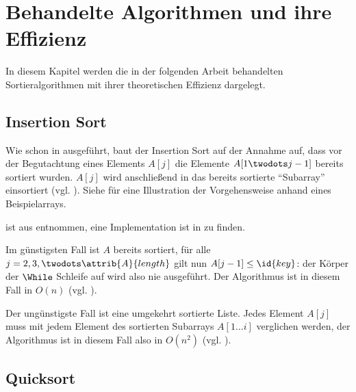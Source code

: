 \chapter{Behandelte Algorithmen und ihre Effizienz}
\label{cha:algorithmen}

In diesem Kapitel werden die in der folgenden Arbeit behandelten Sortieralgorithmen mit ihrer theoretischen Effizienz dargelegt.

\section{Insertion Sort}
\label{sec:alg-insertion}

Wie schon in  ausgeführt, baut der Insertion Sort auf der Annahme auf, dass vor der Begutachtung eines Elements $A[j]$ die Elemente $A[1 \twodots j - 1]$ bereits sortiert wurden. $A[j]$ wird anschließend in das bereits sortierte \enquote{Subarray} einsortiert (vgl. \cite[80]{taocp3}). Siehe  für eine Illustration der Vorgehensweise anhand eines Beispielarrays.





 ist aus \cite[18]{clrs2001} entnommen, eine Implementation ist in  zu finden.

Im günstigsten Fall ist $A$ bereits sortiert, für alle $j = 2, 3, \twodots \attrib{A}{length}$ gilt nun $A[j - 1] \leq \id{key}$: der Körper der $\While$ Schleife auf  wird also nie ausgeführt. Der Algorithmus ist in diesem Fall in $O(n)$ (vgl. \cite[28]{clrs2001}).

Der ungünstigste Fall ist eine umgekehrt sortierte Liste. Jedes Element $A[j]$ muss mit jedem Element des sortierten Subarrays $A[1 \ldots i]$ verglichen werden, der Algorithmus ist in diesem Fall also in $O(n^2)$ (vgl. \cite[28f]{clrs2001}).

\section{Quicksort}
\label{sec:alg-exchanging}

